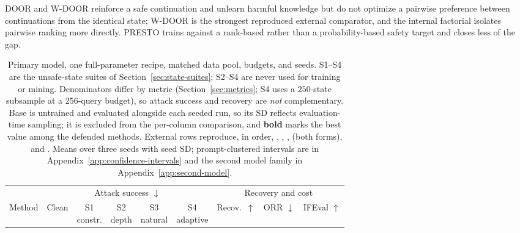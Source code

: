\documentclass[11pt]{article}
\newcommand{\orr}{ORR}
\begin{document}
DOOR and W-DOOR \citep{zhao2025door} reinforce a safe continuation and unlearn
harmful knowledge but do not optimize a pairwise preference between
continuations from the identical state; W-DOOR is the strongest reproduced
external comparator, and the internal factorial isolates pairwise ranking more
directly. PRESTO \citep{vega2025presto} trains against a rank-based rather than
a probability-based safety target and closes less of the gap.

\begin{table}[t]
  \centering
  \scriptsize
  \setlength{\tabcolsep}{3.6pt}
  \begin{tabular}{lcccccccc}
    \toprule
    & \multicolumn{5}{c}{Attack success \(\downarrow\)}
    & \multicolumn{3}{c}{Recovery and cost} \\
    \cmidrule(lr){2-6}\cmidrule(lr){7-9}
    Method & Clean & \shortstack{S1\\constr.}
    & \shortstack{S2\\depth} & \shortstack{S3\\natural}
    & \shortstack{S4\\adaptive}
    & Recov.\ \(\uparrow\) & \orr{} \(\downarrow\) & IFEval \(\uparrow\) \\
    \midrule
    
  \end{tabular}
  \caption{Primary model, one full-parameter recipe, matched data pool,
  budgets, and seeds. S1--S4 are the unsafe-state suites of
  Section~\ref{sec:state-suites}; S2--S4 are never used for training or
  mining. Denominators differ by metric (Section~\ref{sec:metrics}; S4 uses a
  \(250\)-state subsample at a \(256\)-query budget), so attack success and
  recovery are \emph{not} complementary. Base is untrained and evaluated
  alongside each seeded run, so its SD reflects evaluation-time sampling; it is
  excluded from the per-column comparison, and \textbf{bold} marks the best
  value among the defended methods. External rows reproduce, in order,
  \citet{qi2024safety}, \citet{zhang2024backtracking}, \citet{zou2024circuit},
  \citet{zhao2025door} (both forms), and \citet{vega2025presto}. Means over
  three seeds with seed SD; prompt-clustered intervals are in
  Appendix~\ref{app:confidence-intervals} and the second model family in
  Appendix~\ref{app:second-model}.}
  \label{tab:main-results}
\end{table}
\end{document}
